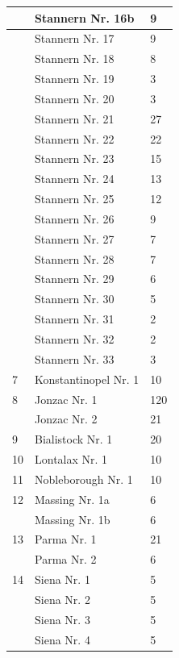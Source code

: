 \documentclass[a4paper, 11pt, oneside, polutonikogreek, german]{article}
\begin{document}
\begin{center}
\begin{longtable}{|l|l|l|}
          & Stannern Nr. 16b & 9 \\ \hline
          & Stannern Nr. 17 & 9 \\ \hline
          & Stannern Nr. 18 & 8 \\ \hline
          & Stannern Nr. 19 & 3 \\ \hline
          & Stannern Nr. 20 & 3 \\ \hline
          & Stannern Nr. 21 & 27 \\ \hline
          & Stannern Nr. 22 & 22 \\ \hline
          & Stannern Nr. 23 & 15 \\ \hline
          & Stannern Nr. 24 & 13 \\ \hline
          & Stannern Nr. 25 & 12 \\ \hline
          & Stannern Nr. 26 & 9 \\ \hline
          & Stannern Nr. 27 & 7 \\ \hline
          & Stannern Nr. 28 & 7 \\ \hline
          & Stannern Nr. 29 & 6 \\ \hline
          & Stannern Nr. 30 & 5 \\ \hline
          & Stannern Nr. 31 & 2 \\ \hline
          & Stannern Nr. 32 & 2 \\ \hline
          & Stannern Nr. 33 & 3 \\ \hline
        7 & Konstantinopel Nr. 1 & 10 \\ \hline
        8 & Jonzac Nr. 1 & 120 \\ \hline
          & Jonzac Nr. 2 & 21 \\ \hline
        9 & Bialistock Nr. 1 & 20 \\ \hline
        10 & Lontalax Nr. 1 & 10 \\ \hline
        11 & Nobleborough Nr. 1 & 10 \\ \hline
        12 & Massing Nr. 1a & 6 \\ \hline
          & Massing Nr. 1b & 6 \\ \hline
        13 & Parma Nr. 1 & 21 \\ \hline
          & Parma Nr. 2 & 6 \\ \hline
        14 & Siena Nr. 1 & 5 \\ \hline
          & Siena Nr. 2 & 5 \\ \hline
          & Siena Nr. 3 & 5 \\ \hline
          & Siena Nr. 4 & 5 \\ \hline

\end{longtable}
\end{center}
\end{document}
